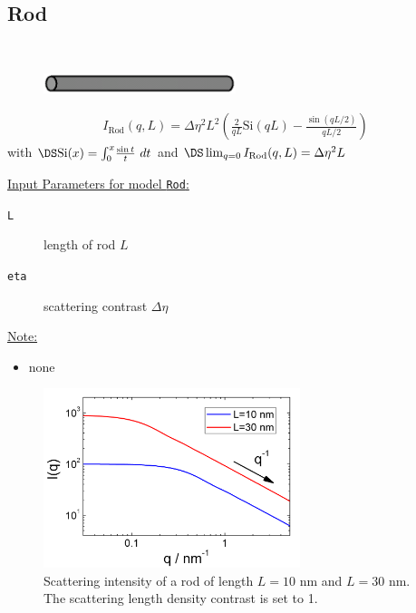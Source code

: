 
\newpage
\subsection{Rod}
\label{sect:Rod}
~\\

\begin{figure}[htb]
\begin{center}
\includegraphics[width=0.5\textwidth,height=0.05194\textwidth]{../images/form_factor/cylindrical_obj/rod.png}
\end{center}
\caption{} \label{rod}
\end{figure}
\begin{align}
I_\text{Rod}(q,L) = \Delta\eta^2L^2\left(\frac{2}{qL}\text{Si}(qL)
                                         - \frac{\sin(qL/2)}{qL/2}
                                   \right)
\end{align}
with $\DS \text{Si}(x)=\int_0^x\!\frac{\sin t}{t}\,\,dt$ and $\DS
\lim_{q=0} I_\text{Rod}(q,L) = \Delta\eta^2L$

\vspace{5mm}

\underline{Input Parameters for model \texttt{Rod}:}
\begin{description}
\item[\texttt{L}] length of rod $L$
\item[\texttt{eta}] scattering contrast $\Delta\eta$
\end{description}

\underline{Note:}
\begin{itemize}
\item none
\end{itemize}

\begin{figure}[htb]
\begin{center}
\includegraphics[width=0.668\textwidth,height=0.488\textwidth]{../images/form_factor/cylindrical_obj/RodIQ.png}
\end{center}
\caption{Scattering intensity of a rod of length $L=10$ nm and $L=30$ nm.
The scattering length density contrast is set to 1.}
\label{fig:I_rod}
\end{figure}

